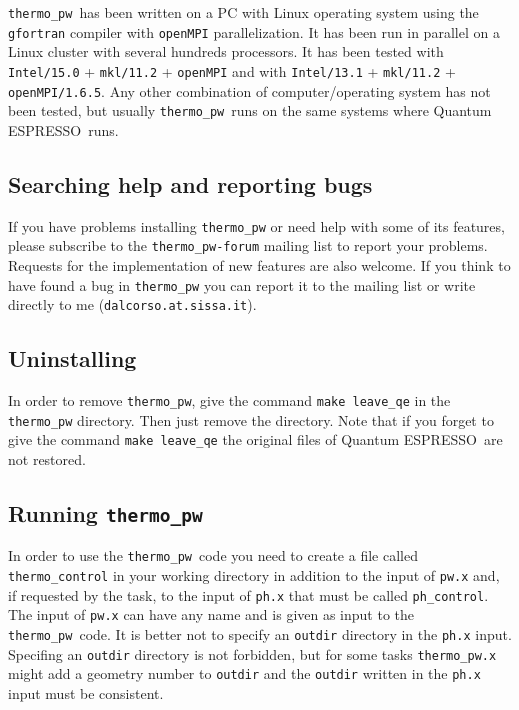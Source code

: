 \documentclass[12pt,a4paper]{article}
\def\qe{{\sc Quantum ESPRESSO}}
\def\thermo{\texttt{thermo\_pw}}
\begin{document}
\thermo\ has been written on a PC with Linux operating system using the
\texttt{gfortran} compiler with \texttt{openMPI} parallelization. It has
been run in parallel on a Linux cluster with several hundreds processors.
It has been tested with \texttt{Intel/15.0} + \texttt{mkl/11.2} +
\texttt{openMPI} and with \texttt{Intel/13.1} + \texttt{mkl/11.2} +
\texttt{openMPI/1.6.5}.
Any other combination of computer/operating system has not been tested, but 
usually \thermo\ runs on the same systems where \qe\ runs. 

\subsection{\color{web-blue}Searching help and reporting bugs}
If you have problems installing \texttt{thermo\_pw} or need help
with some of its features, please subscribe to the \texttt{thermo\_pw-forum}
mailing list to report your problems. Requests for the implementation 
of new features are also welcome. If you think to have found a bug 
in \texttt{thermo\_pw} you can report it to the mailing list or 
write directly to me (\texttt{dalcorso.at.sissa.it}).

\subsection{\color{web-blue}Uninstalling}

In order to remove \thermo, give the command \texttt{make leave\_qe} in the
\texttt{thermo\_pw} directory. Then just remove the directory. Note that if
you forget to give the command \texttt{make leave\_qe} the original files
of \qe\ are not restored.

\subsection{\color{web-blue}Running \thermo}

In order to use the \thermo\ code you need to create a file called
\texttt{thermo\_control} in your working directory in addition to 
the input of \texttt{pw.x} and, if requested by the task, to the
input of \texttt{ph.x} that must be called \texttt{ph\_control}.
The input of \texttt{pw.x} can have any name and is given as input to
the \thermo\ code. It is better not to specify an \texttt{outdir} 
directory in the \texttt{ph.x} input. Specifing an \texttt{outdir}
directory is not forbidden, but for some tasks \texttt{thermo\_pw.x} 
might add a geometry number to \texttt{outdir} and the
\texttt{outdir} written in the \texttt{ph.x} input must be consistent.
\end{document}
